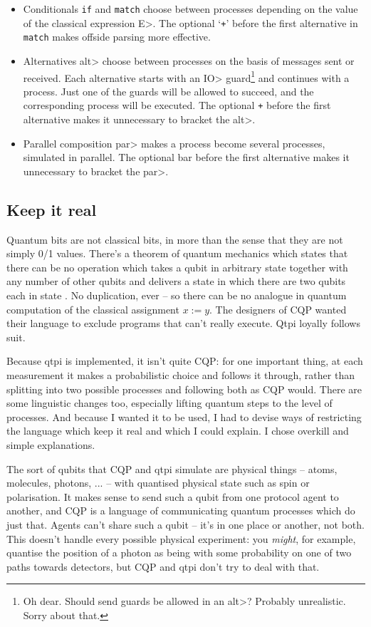 \documentclass[11pt,a4paper]{article}
\newcommand{\verbtt}[1]{\texttt{\small{}#1}}
\begin{document}
\begin{itemize}
\item Conditionals \verbtt{if} and \verbtt{match} choose between processes depending on the value of the classical expression \<E>. The optional `\verbtt{+}' before the first alternative in \verbtt{match} makes offside parsing more effective.
\item Alternatives \<alt> choose between processes on the basis of messages sent or received. Each alternative starts with an \<IO> guard\footnote{Oh dear. Should send guards be allowed in an \<alt>? Probably unrealistic. Sorry about that.} and continues with a process. Just one of the guards will be allowed to succeed, and the corresponding process will be executed. The optional \verbtt{+} before the first alternative makes it unnecessary to bracket the \<alt>.
\item Parallel composition \<par> makes a process become several processes, simulated in parallel. The optional bar before the first alternative makes it unnecessary to bracket the \<par>.
\end{itemize}

\subsection{Keep it real}

Quantum bits are not classical bits, in more than the sense that they are not simply 0/1 values. There's a theorem of quantum mechanics which states that there can be no operation which takes a qubit in arbitrary state \bv{\phi} together with any number of other qubits and delivers a state in which there are two qubits each in state \bv{\phi}. No duplication, ever -- so there can be no analogue in quantum computation of the classical assignment $x:=y$. The designers of CQP \citep{GaySJ:comqp} wanted their language to exclude programs that can't really execute. Qtpi loyally follows suit.

Because qtpi is implemented, it isn't quite CQP: for one important thing, at each measurement it makes a probabilistic choice and follows it through, rather than splitting into two possible processes and following both as CQP would. There are some linguistic changes too, especially lifting quantum steps to the level of processes. And because I wanted it to be used, I had to devise ways of restricting the language which keep it real and which I could explain. I chose overkill and simple explanations. 

The sort of qubits that CQP and qtpi simulate are physical things -- atoms, molecules, photons, ... -- with quantised physical state such as spin or polarisation. It makes sense to send such a qubit from one protocol agent to another, and CQP is a language of communicating quantum processes which do just that. Agents can't share such a qubit -- it's in one place or another, not both. This doesn't handle every possible physical experiment: you \emph{might}, for example,  quantise the position of a photon as being with some probability on one of two paths towards detectors, but CQP and qtpi don't try to deal with that.
\end{document}
